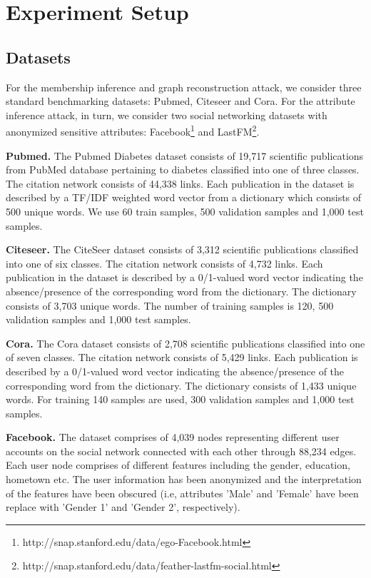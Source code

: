 \section{Experiment Setup}\label{setup}


\subsection{Datasets}

For the membership inference and graph reconstruction attack, we consider three standard benchmarking datasets: Pubmed, Citeseer and Cora.
For the attribute inference attack, in turn, we consider two social networking datasets with anonymized sensitive attributes: Facebook\footnote{http://snap.stanford.edu/data/ego-Facebook.html} and LastFM\footnote{http://snap.stanford.edu/data/feather-lastfm-social.html}.

\noindent\textbf{Pubmed.} The Pubmed Diabetes dataset consists of 19,717 scientific publications from PubMed database pertaining to diabetes classified into one of three classes. The citation network consists of 44,338 links. Each publication in the dataset is described by a TF/IDF weighted word vector from a dictionary which consists of 500 unique words.
We use 60 train samples, 500 validation samples and 1,000 test samples.

\noindent\textbf{Citeseer.} The CiteSeer dataset consists of 3,312 scientific publications classified into one of six classes.
The citation network consists of 4,732 links. Each publication in the dataset is described by a 0/1-valued word vector indicating the absence/presence of the corresponding word from the dictionary.
The dictionary consists of 3,703 unique words.
The number of training samples is 120, 500 validation samples and 1,000 test samples.

\noindent\textbf{Cora.} The Cora dataset consists of 2,708 scientific publications classified into one of seven classes.
The citation network consists of 5,429 links. Each publication is described by a 0/1-valued word vector indicating the absence/presence of the corresponding word from the dictionary.
The dictionary consists of 1,433 unique words.
For training 140 samples are used, 300 validation samples and 1,000 test samples.

\noindent\textbf{Facebook.} The dataset comprises of 4,039 nodes representing different user accounts on the social network connected with each other through 88,234 edges.
Each user node comprises of different features including the gender, education, hometown etc.
The user information has been anonymized and the interpretation of the features have been obscured (i.e, attributes 'Male' and 'Female' have been replace with 'Gender 1' and 'Gender 2', respectively).



